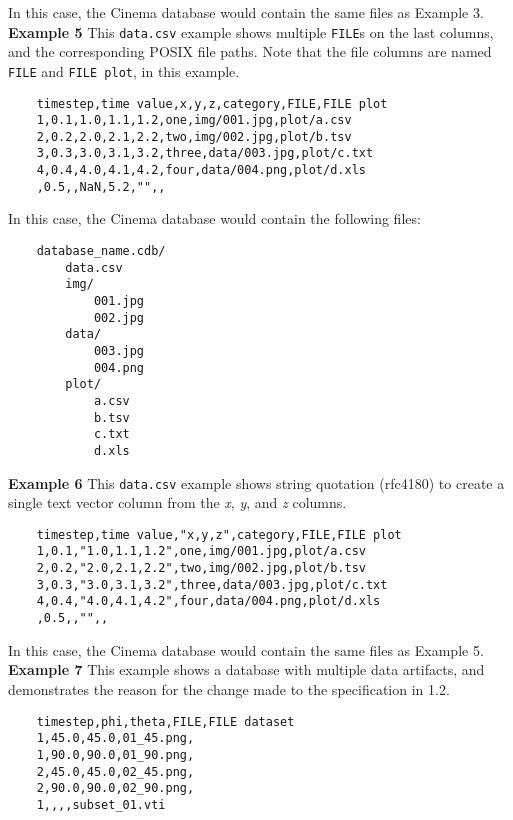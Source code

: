 \noindent
In this case, the Cinema database would contain the same files as 
Example 3. \\

\noindent
\textbf{Example 5} This \texttt{\small data.csv} example shows multiple
\texttt{\small FILE}s on the last columns, and the corresponding POSIX file 
paths. Note that the file columns are named \texttt{\small FILE}
and \texttt{\small FILE plot}, in this example.

\begin{verbatim}
    timestep,time value,x,y,z,category,FILE,FILE plot
    1,0.1,1.0,1.1,1.2,one,img/001.jpg,plot/a.csv
    2,0.2,2.0,2.1,2.2,two,img/002.jpg,plot/b.tsv
    3,0.3,3.0,3.1,3.2,three,data/003.jpg,plot/c.txt
    4,0.4,4.0,4.1,4.2,four,data/004.png,plot/d.xls
    ,0.5,,NaN,5.2,"",,
\end{verbatim}

\noindent
In this case, the Cinema database would contain the following files:

\begin{verbatim}
    database_name.cdb/
        data.csv
        img/
            001.jpg
            002.jpg
        data/
            003.jpg
            004.png
        plot/
            a.csv
            b.tsv
            c.txt
            d.xls
\end{verbatim}

\noindent
\textbf{Example 6} This \texttt{\small data.csv} example shows string
quotation (rfc4180) to create a single text vector column from the
{\em x}, {\em y}, and {\em z} columns.

\begin{verbatim}
    timestep,time value,"x,y,z",category,FILE,FILE plot
    1,0.1,"1.0,1.1,1.2",one,img/001.jpg,plot/a.csv
    2,0.2,"2.0,2.1,2.2",two,img/002.jpg,plot/b.tsv
    3,0.3,"3.0,3.1,3.2",three,data/003.jpg,plot/c.txt
    4,0.4,"4.0,4.1,4.2",four,data/004.png,plot/d.xls
    ,0.5,,"",,
\end{verbatim}

\noindent
In this case, the Cinema database would contain the same files as Example 5. \\

\noindent
\textbf{Example 7} This example shows a database with multiple data artifacts,
and demonstrates the reason for the change made to the specification in 1.2. 

\begin{verbatim}
    timestep,phi,theta,FILE,FILE dataset
    1,45.0,45.0,01_45.png,
    1,90.0,90.0,01_90.png,
    2,45.0,45.0,02_45.png,
    2,90.0,90.0,02_90.png,
    1,,,,subset_01.vti
\end{verbatim}

